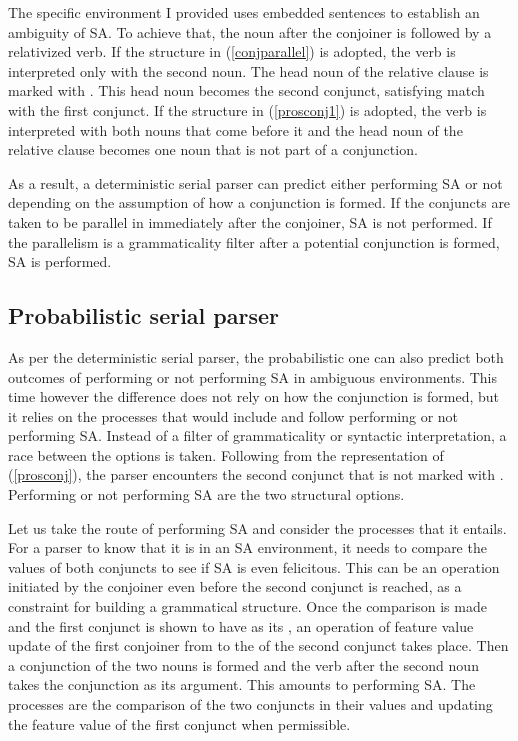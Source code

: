 The specific environment I provided uses embedded sentences to establish an ambiguity of {\Case} SA. To achieve that, the noun after the conjoiner is followed by a relativized verb. If the structure in (\ref{conjparallel}) is adopted, the verb is interpreted only with the second noun. The head noun of the relative clause is marked with {\Nom}. This head noun becomes the second conjunct, satisfying {\Case} match with the first conjunct. If the structure in (\ref{prosconj1}) is adopted, the verb is interpreted with both nouns that come before it and the head noun of the relative clause becomes one noun that is not part of a conjunction.

As a result, a deterministic serial parser can predict either performing SA or not depending on the assumption of how a conjunction is formed. If the conjuncts are taken to be parallel in {\Case} immediately after the conjoiner, SA is not performed. If the {\Case} parallelism is a grammaticality filter after a potential conjunction is formed, SA is performed.


\subsection{Probabilistic serial parser}

As per the deterministic serial parser, the probabilistic one can also predict both outcomes of performing or not performing SA in ambiguous environments. This time however the difference does not rely on how the conjunction is formed, but it relies on the processes that would include and follow performing or not performing SA. Instead of a filter of grammaticality or syntactic interpretation, a race between the options is taken. Following from the representation of (\ref{prosconj}), the parser encounters the second conjunct that is not marked with {\Nom}. Performing or not performing SA are the two structural options.

Let us take the route of performing SA and consider the processes that it entails. For a parser to know that it is in an SA environment, it needs to compare the {\Case} values of both conjuncts to see if SA is even felicitous. This can be an operation initiated by the conjoiner even before the second conjunct is reached, as a constraint for building a grammatical structure. Once the comparison is made and the first conjunct is shown to have {\Nom} as its {\Case}, an operation of feature value update of the first conjoiner from {\Nom} to the {\Case} of the second conjunct takes place. Then a conjunction of the two nouns is formed and the verb after the second noun takes the conjunction as its argument. This amounts to performing SA. The processes are the comparison of the two conjuncts in their {\Case} values and updating the feature value of the first conjunct when permissible.


